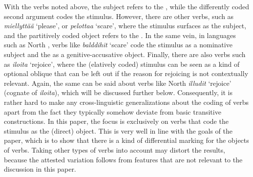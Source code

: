 \documentclass[output=paper]{LSP/langsci}
\begin{document}
 With the  verbs noted above, the subject refers to the , while the differently coded second argument codes the stimulus. However, there are other verbs, such as \textit{miellyttää} ‘please’, or \textit{pelottaa} ‘scare’, where the stimulus surfaces as the subject, and the partitively coded object refers to the . In the same vein, in  languages such as North , verbs like \textit{balddihit} ‘scare’ code the stimulus as a nominative subject and the  as a genitive-accusative object. Finally, there are also verbs such as  \textit{iloita} ‘rejoice’, where the (elatively coded) stimulus can be seen as a kind of optional oblique that can be left out if the reason for rejoicing is not contextually relevant. Again, the same can be said about  verbs like North  \textit{illudit} ‘rejoice’ (cognate of  \textit{iloita}), which will be discussed further below. Consequently, it is rather hard to make any cross-linguistic generalizations about the coding of  verbs apart from the fact they typically somehow deviate from basic transitive constructions. In this paper, the focus is exclusively on  verbs that code the stimulus as the (direct) object. This is very well in line with the goals of the paper, which is to show that there is a kind of differential marking for the objects of  verbs. Taking other types of  verbs into account may distort the results, because the attested variation follows from features that are not relevant to the discussion in this paper.
\end{document}
